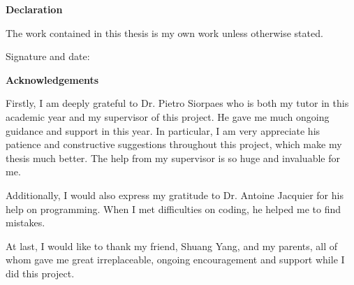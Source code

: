 

\mbox{}\newline\vspace{10mm} \mbox{}\LARGE
%
{\bf Declaration} \normalsize \vspace{5mm}

The work contained in this thesis is my own work unless otherwise stated.

\bigskip
\bigskip
\bigskip


Signature and date: 


\newpage

\mbox{}\newline\vspace{10mm} \mbox{}\LARGE
%
{\bf Acknowledgements} \normalsize \vspace{5mm}

Firstly, I am deeply grateful to Dr. Pietro Siorpaes who is both my tutor in this academic year and my supervisor of this project. He gave me much ongoing guidance and support in this year. In particular, I am very appreciate his patience and constructive suggestions throughout this project, which make my thesis much better. The help from my supervisor is so huge and invaluable for me.


Additionally, I would also express my gratitude to Dr. Antoine Jacquier for his help on programming. When I met difficulties on coding, he helped me to find mistakes.

At last, I would like to thank my friend, Shuang Yang, and my parents, all of whom gave me great irreplaceable, ongoing encouragement and support while I did this project.



